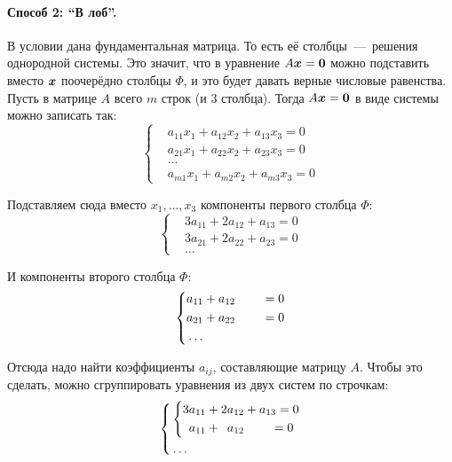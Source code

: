 \documentclass[a4paper,12pt]{article}
\begin{document}
\begin{solution}
    \bigskip
    
    \paragraph{Способ 2: ``В лоб''.}
    
    В условии дана фундаментальная матрица.
    То есть её столбцы~---~решения однородной системы.
    Это значит, что в уравнение $A \bds x \hm= \bds 0$ можно подставить вместо $\boldsymbol x$ поочерёдно столбцы $\Phi$, и это будет давать верные числовые равенства.
    Пусть в матрице $A$ всего $m$ строк (и $3$ столбца).
    Тогда $A \bds x \hm= \bds 0$ в виде системы можно записать так:
    \[
      \left\{
        \begin{aligned}
          &a_{11} x_1 + a_{12} x_2 + a_{13} x_3 = 0\\
          &a_{21} x_1 + a_{22} x_2 + a_{23} x_3 = 0\\
          &\ldots\\
          &a_{m1} x_1 + a_{m2} x_2 + a_{m3} x_3 = 0
        \end{aligned}
      \right.
    \]
    
    Подставляем сюда вместо $x_1, \ldots, x_3$ компоненты первого столбца $\Phi$:
    \[
      \left\{
        \begin{aligned}
          &3 a_{11} + 2 a_{12} + a_{13} = 0\\
          &3 a_{21} + 2 a_{22} + a_{23} = 0\\
          &\ldots
        \end{aligned}
      \right.
    \]
    
    И компоненты второго столбца $\Phi$:
    \[
      \left\{
        \begin{aligned}
          &a_{11} + a_{12} \hphantom{+ a_{13}} = 0\\
          &a_{21} + a_{22} \hphantom{+ a_{23}} = 0\\
          &\ldots
        \end{aligned}
      \right.
    \]
    
    Отсюда надо найти коэффициенты $a_{ij}$, составляющие матрицу $A$.
    Чтобы это сделать, можно сгруппировать уравнения из двух систем по строчкам:
    \[
      \left\{
        \begin{aligned}
          &\left\{
            \begin{aligned}
              &3 a_{11} + 2 a_{12} + a_{13} = 0\\
              &\hphantom{3}a_{11} + \hphantom{2}a_{12} \hphantom{+ a_{13}} = 0
            \end{aligned}
          \right.\\
          &\ldots
        \end{aligned}
      \right.
    \]
    

\end{solution}
\end{document}
